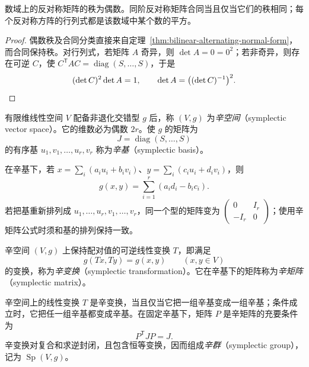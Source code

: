 \begin{corollary}
\label{cor:bilinear-skew-matrix-classification}
数域上的反对称矩阵的秩为偶数。同阶反对称矩阵合同当且仅当它们的秩相同；每个反对称方阵的行列式都是该数域中某个数的平方。
\end{corollary}

\begin{proof}
偶数秩及合同分类直接来自定理~\ref{thm:bilinear-alternating-normal-form}，而合同保持秩。对行列式，若矩阵 $A$ 奇异，则 $\det A=0=0^2$；若非奇异，则存在可逆 $C$，使 $C^{\mathsf T}AC=\operatorname{diag}(S,\ldots,S)$，于是
\[
    (\det C)^2\det A=1,\qquad
    \det A=\bigl((\det C)^{-1}\bigr)^2.\qedhere
\]
\end{proof}

\begin{definition}
\label{def:bilinear-symplectic-space}
有限维线性空间 $V$ 配备非退化交错型 $g$ 后，称 $(V,g)$ 为\emph{辛空间}（symplectic vector space）。它的维数必为偶数 $2r$。使 $g$ 的矩阵为
\[
    J=\operatorname{diag}(S,\ldots,S)
\]
的有序基 $u_1,v_1,\ldots,u_r,v_r$ 称为\emph{辛基}（symplectic basis）。
\end{definition}

在辛基下，若 $x=\sum_i(a_i u_i+b_i v_i)$、$y=\sum_i(c_i u_i+d_i v_i)$，则
\begin{equation}
\label{eq:bilinear-symplectic-coordinate-form}
    g(x,y)=\sum_{i=1}^r(a_i d_i-b_i c_i).
\end{equation}
若把基重新排列成 $u_1,\ldots,u_r,v_1,\ldots,v_r$，同一个型的矩阵变为 $\begin{pmatrix}0&I_r\\-I_r&0\end{pmatrix}$；使用辛矩阵公式时须和基的排列保持一致。

\begin{definition}
\label{def:bilinear-symplectic-transformation}
辛空间 $(V,g)$ 上保持配对值的可逆线性变换 $T$，即满足
\[
    g(Tx,Ty)=g(x,y)\qquad(x,y\in V)
\]
的变换，称为\emph{辛变换}（symplectic transformation）。它在辛基下的矩阵称为\emph{辛矩阵}（symplectic matrix）。
\end{definition}

\begin{proposition}
\label{prop:bilinear-symplectic-group}
辛空间上的线性变换 $T$ 是辛变换，当且仅当它把一组辛基变成一组辛基；条件成立时，它把任一组辛基都变成辛基。在固定辛基下，矩阵 $P$ 是辛矩阵的充要条件为
\begin{equation}
\label{eq:bilinear-symplectic-matrix}
    P^{\mathsf T}JP=J.
\end{equation}
辛变换对复合和求逆封闭，且包含恒等变换，因而组成\emph{辛群}（symplectic group），记为 $\operatorname{Sp}(V,g)$。
\end{proposition}

